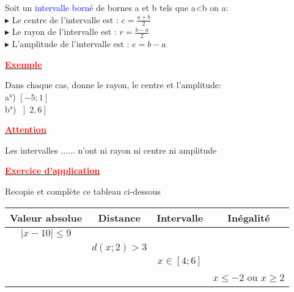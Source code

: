 \documentclass[12pt]{article}
\begin{document}
Soit un \textcolor{blue}{intervalle borné} de bornes a et b tels que a<b on a:\\
$\blacktriangleright$ Le centre de l'intervalle est : $c =\frac{a+b}{2}$\\
$\blacktriangleright$ Le rayon de l'intervalle est : $r =\frac{b-a}{2}$\\
$\blacktriangleright$ L'amplitude de l'intervalle est : $e=b-a$
\begin{center}
\underline{\textbf{\textcolor{red}{Exemple}}}\\
\end{center}
Dans chaque cas, donne le rayon, le centre et l'amplitude:\\
a°) $\left[-5;1\right] $ \\
b°) $\left] 2,6 \right] $ \\
\begin{center}
\underline{\textbf{\textcolor{red}{Attention}}}\\
\end{center}
Les intervalles ...... n'ont ni rayon ni centre ni amplitude\\
\begin{center}
\underline{\textbf{\textcolor{red}{Exercice d'application}}}\\
\end{center}
Recopie et complète ce tableau ci-dessous\\

\begin{tabular}{|c|c|c|c|}
  \hline
  Valeur absolue & Distance & Intervalle & Inégalité \\
  \hline
  $|x-10| \leqslant 9$ & & & \\
  \hline
  & $d(x;2) >3$ & & \\
  \hline
  &  &$x \in[4;6]$ & \\
  \hline
  & & & $x \leqslant -2$ ou $x \geqslant 2$ \\
  \hline
\end{tabular}
\end{document}
